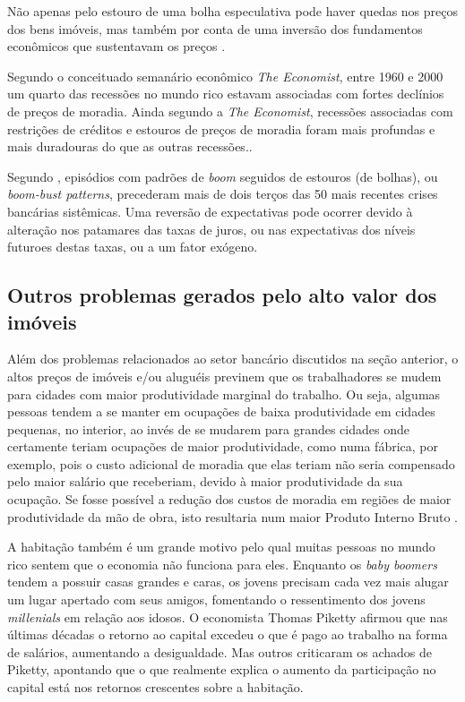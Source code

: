 \documentclass[
	12pt,				%
	oneside,			%
	a4paper,			%
	chapter=TITLE,		%
	section=TITLE,		%
	english,			%
	brazil				%
	]{abntex2}
\begin{document}
\begin{refsection}
Não apenas pelo estouro de uma bolha especulativa pode haver quedas nos preços
dos bens imóveis, mas também por conta de uma inversão dos fundamentos
econômicos que sustentavam os preços \autocite[129]{Case2000}.

Segundo o conceituado semanário econômico \emph{The Economist}, entre 1960 e 2000 um
quarto das recessões no mundo rico estavam associadas com fortes declínios de
preços de moradia. Ainda segundo a \emph{The Economist}, recessões associadas com
restrições de créditos e estouros de preços de moradia foram mais profundas e
mais duradouras do que as outras recessões.\autocite{economist-housing-2020}.

Segundo \textcite{fmiera}, episódios com padrões de \emph{boom} seguidos de estouros (de
bolhas), ou \emph{boom-bust patterns}, precederam mais de dois terços das 50 mais
recentes crises bancárias sistêmicas. Uma reversão de expectativas pode ocorrer
devido à alteração nos patamares das taxas de juros, ou nas expectativas dos
níveis futuroes destas taxas, ou a um fator exógeno.

\hypertarget{outros-problemas-gerados-pelo-alto-valor-dos-imuxf3veis}{%
\subsection{Outros problemas gerados pelo alto valor dos imóveis}\label{outros-problemas-gerados-pelo-alto-valor-dos-imuxf3veis}}

Além dos problemas relacionados ao setor bancário discutidos na seção anterior,
o altos preços de imóveis e/ou aluguéis previnem que os trabalhadores se mudem
para cidades com maior produtividade marginal do trabalho. Ou seja, algumas
pessoas tendem a se manter em ocupações de baixa produtividade em cidades
pequenas, no interior, ao invés de se mudarem para grandes cidades onde
certamente teriam ocupações de maior produtividade, como numa fábrica, por
exemplo, pois o custo adicional de moradia que elas teriam não seria compensado
pelo maior salário que receberiam, devido à maior produtividade da sua ocupação.
Se fosse possível a redução dos custos de moradia em regiões de maior
produtividade da mão de obra, isto resultaria num maior Produto Interno Bruto
\autocites[149]{Case2000}{economist-housing-2020}.
\begin{citacao}
A habitação também é um grande motivo pelo qual muitas pessoas no mundo rico
sentem que o economia não funciona para eles. Enquanto os \emph{baby boomers}
tendem a possuir casas grandes e caras, os jovens precisam cada vez mais alugar
um lugar apertado com seus amigos, fomentando o ressentimento dos jovens
\emph{millenials} em relação aos idosos. O economista Thomas Piketty afirmou que
nas últimas décadas o retorno ao capital excedeu o que é pago ao trabalho na
forma de salários, aumentando a desigualdade. Mas outros criticaram os achados
de Piketty, apontando que o que realmente explica o aumento da participação no
capital está nos retornos crescentes sobre a habitação.
\cite{economist-housing-2020}
\end{citacao}
\hypertarget{e-populismo}{%
}
\end{refsection}
\end{document}
